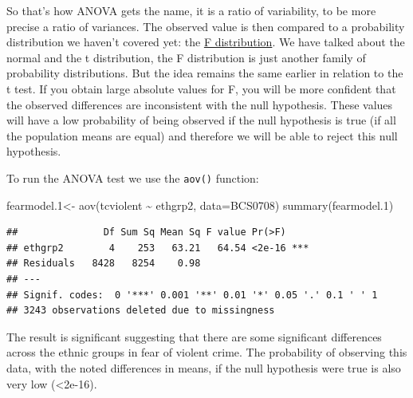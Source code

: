 \documentclass[
]{book}
\newenvironment{Shaded}{\begin{snugshade}}{\end{snugshade}}
\newcommand{\AttributeTok}[1]{\textcolor[rgb]{0.77,0.63,0.00}{#1}}
\newcommand{\FloatTok}[1]{\textcolor[rgb]{0.00,0.00,0.81}{#1}}
\newcommand{\FunctionTok}[1]{\textcolor[rgb]{0.00,0.00,0.00}{#1}}
\newcommand{\NormalTok}[1]{#1}
\newcommand{\OtherTok}[1]{\textcolor[rgb]{0.56,0.35,0.01}{#1}}
\newcommand{\SpecialCharTok}[1]{\textcolor[rgb]{0.00,0.00,0.00}{#1}}
\begin{document}
So that's how ANOVA gets the name, it is a ratio of variability, to be more precise a ratio of variances. The observed value is then compared to a probability distribution we haven't covered yet: the \href{http://en.wikipedia.org/wiki/F-distribution}{F distribution}. We have talked about the normal and the t distribution, the F distribution is just another family of probability distributions. But the idea remains the same earlier in relation to the t test. If you obtain large absolute values for F, you will be more confident that the observed differences are inconsistent with the null hypothesis. These values will have a low probability of being observed if the null hypothesis is true (if all the population means are equal) and therefore we will be able to reject this null hypothesis.

To run the ANOVA test we use the \texttt{aov()} function:

\begin{Shaded}
\begin{Highlighting}[]
\NormalTok{fearmodel}\FloatTok{.1}\OtherTok{\textless{}{-}} \FunctionTok{aov}\NormalTok{(tcviolent }\SpecialCharTok{\textasciitilde{}}\NormalTok{ ethgrp2, }\AttributeTok{data=}\NormalTok{BCS0708)}
\FunctionTok{summary}\NormalTok{(fearmodel}\FloatTok{.1}\NormalTok{)}
\end{Highlighting}
\end{Shaded}

\begin{verbatim}
##               Df Sum Sq Mean Sq F value Pr(>F)    
## ethgrp2        4    253   63.21   64.54 <2e-16 ***
## Residuals   8428   8254    0.98                   
## ---
## Signif. codes:  0 '***' 0.001 '**' 0.01 '*' 0.05 '.' 0.1 ' ' 1
## 3243 observations deleted due to missingness
\end{verbatim}

The result is significant suggesting that there are some significant differences across the ethnic groups in fear of violent crime. The probability of observing this data, with the noted differences in means, if the null hypothesis were true is also very low (\textless2e-16).
\end{document}

